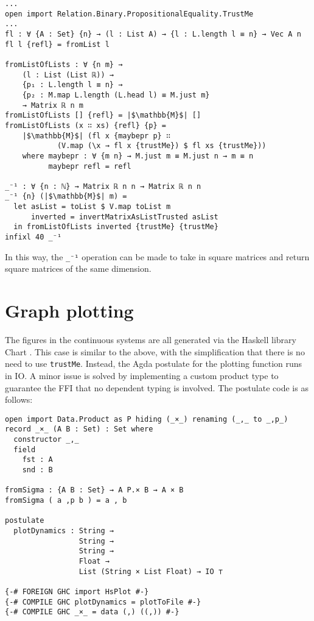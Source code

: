 \begin{verbatim}
...
open import Relation.Binary.PropositionalEquality.TrustMe
...
fl : ∀ {A : Set} {n} → (l : List A) → {l : L.length l ≡ n} → Vec A n
fl l {refl} = fromList l

fromListOfLists : ∀ {n m} → 
    (l : List (List ℝ)) → 
    {p₁ : L.length l ≡ n} → 
    {p₂ : M.map L.length (L.head l) ≡ M.just m}
    → Matrix ℝ n m
fromListOfLists [] {refl} = |$\mathbb{M}$| []
fromListOfLists (x ∷ xs) {refl} {p} = 
    |$\mathbb{M}$| (fl x {maybepr p} ∷ 
            (V.map (\x → fl x {trustMe}) $ fl xs {trustMe}))
    where maybepr : ∀ {m n} → M.just m ≡ M.just n → m ≡ n
          maybepr refl = refl

_⁻¹ : ∀ {n : ℕ} → Matrix ℝ n n → Matrix ℝ n n
_⁻¹ {n} (|$\mathbb{M}$| m) =
  let asList = toList $ V.map toList m
      inverted = invertMatrixAsListTrusted asList
  in fromListOfLists inverted {trustMe} {trustMe}
infixl 40 _⁻¹
\end{verbatim}

In this way, the \texttt{\_⁻¹} operation can be made to take in square matrices and return square matrices of the same dimension.

\section{Graph plotting}

The figures in the continuous systems are all generated via the Haskell library Chart \cite{chart}. This case is similar to the above, with the simplification that there is no need to use \texttt{trustMe}. Instead, the Agda postulate for the plotting function runs in IO. A minor issue is solved by implementing a custom product type to guarantee the FFI that no dependent typing is involved. The postulate code is as follows:
\begin{verbatim}
open import Data.Product as P hiding (_×_) renaming (_,_ to _,p_)
record _×_ (A B : Set) : Set where
  constructor _,_
  field
    fst : A
    snd : B

fromSigma : {A B : Set} → A P.× B → A × B
fromSigma ( a ,p b ) = a , b

postulate
  plotDynamics : String → 
                 String → 
                 String → 
                 Float → 
                 List (String × List Float) → IO ⊤

{-# FOREIGN GHC import HsPlot #-}
{-# COMPILE GHC plotDynamics = plotToFile #-}
{-# COMPILE GHC _×_ = data (,) ((,)) #-}
\end{verbatim}

